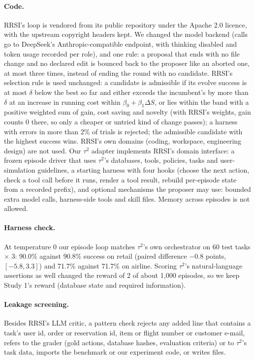 \documentclass[11pt]{article}
\begin{document}
\paragraph{Code.} RRSI's loop is vendored from its public repository under the Apache 2.0 licence, with the upstream copyright headers kept. We changed the model backend (calls go to DeepSeek's Anthropic-compatible endpoint, with thinking disabled and token usage recorded per role), and one rule: a proposal that ends with no file change and no declared edit is bounced back to the proposer like an aborted one, at most three times, instead of ending the round with no candidate. RRSI's selection rule is used unchanged: a candidate is admissible if its evolve success is at most $\delta$ below the best so far and either exceeds the incumbent's by more than $\delta$ at an increase in running cost within $\beta_0+\beta_1\Delta S$, or lies within the band with a positive weighted sum of gain, cost saving and novelty (with RRSI's weights, gain counts 0 there, so only a cheaper or untried kind of change passes); a harness with errors in more than 2\% of trials is rejected; the admissible candidate with the highest success wins. RRSI's own domains (coding, workspace, engineering design) are not used. Our $\tau^2$ adapter implements RRSI's domain interface: a frozen episode driver that uses $\tau^2$'s databases, tools, policies, tasks and user-simulation guidelines, a starting harness with four hooks (choose the next action, check a tool call before it runs, render a tool result, rebuild per-episode state from a recorded prefix), and optional mechanisms the proposer may use: bounded extra model calls, harness-side tools and skill files. Memory across episodes is not allowed.

\paragraph{Harness check.} At temperature 0 our episode loop matches $\tau^2$'s own orchestrator on 60 test tasks $\times$ 3: 90.0\% against 90.8\% success on retail (paired difference $-0.8$ points, $[-5.8,3.3]$) and 71.7\% against 71.7\% on airline. Scoring $\tau^2$'s natural-language assertions as well changed the reward of 2 of about 1{,}000 episodes, so we keep Study 1's reward (database state and required information).

\paragraph{Leakage screening.} Besides RRSI's LLM critic, a pattern check rejects any added line that contains a task's user id, order or reservation id, item or flight number or customer e-mail, refers to the grader (gold actions, database hashes, evaluation criteria) or to $\tau^2$'s task data, imports the benchmark or our experiment code, or writes files.
\end{document}
